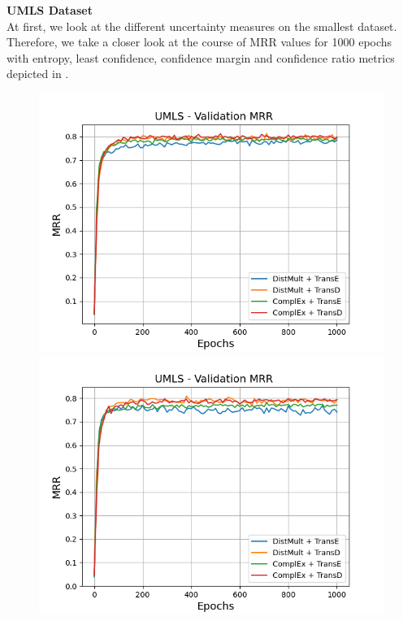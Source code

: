 \textbf{UMLS Dataset}
\label{subsubsec:metrics_umls}\\
%
At first, we look at the different uncertainty measures on the smallest \umls dataset.
Therefore, we take a closer look at the course of MRR values for 1000 epochs with entropy, least confidence, confidence margin and confidence ratio metrics depicted in .
\begin{figure}[H]
    \centering
    \begin{minipage}{.5\textwidth}
      \centering
      \includegraphics[width=0.9\linewidth]{figures/results/gan_train/not_pretrained/uncertainty/max_distribution/entropy/umls/1k_epochs/uncertainty_umls_mrrs.png}
    \end{minipage}%
    \begin{minipage}{.5\textwidth}
      \centering
      \includegraphics[width=0.9\linewidth]{figures/results/gan_train/not_pretrained/uncertainty/max_distribution/least_confidence/umls/uncertainty_umls_mrrs.png}

\end{minipage}
\end{figure}
